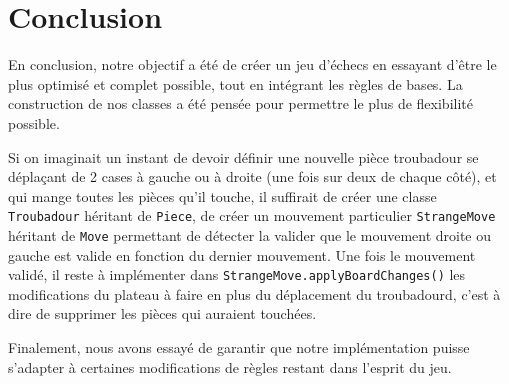 \documentclass[12pt]{article}
\begin{document}
\section{Conclusion}

En conclusion, notre objectif a été de créer un jeu d'échecs en essayant d'être le plus optimisé et complet possible, tout en intégrant les règles de bases. La construction de nos classes a été pensée pour permettre le plus de flexibilité possible. 

Si on imaginait un instant de devoir définir une nouvelle pièce troubadour se déplaçant de 2 cases à gauche ou à droite (une fois sur deux de chaque côté), et qui mange toutes les pièces qu'il touche, il suffirait de créer une classe \texttt{Troubadour} héritant de \texttt{Piece}, de créer un mouvement particulier \texttt{StrangeMove} héritant de \texttt{Move} permettant de détecter la valider que le mouvement droite ou gauche est valide en fonction du dernier mouvement. Une fois le mouvement validé, il reste à implémenter dans \texttt{StrangeMove.applyBoardChanges()} les modifications du plateau à faire en plus du déplacement du troubadourd, c'est à dire de supprimer les pièces qui auraient touchées.

Finalement, nous avons essayé de garantir que notre implémentation puisse s'adapter à certaines modifications de règles restant dans l'esprit du jeu.
\end{document}

